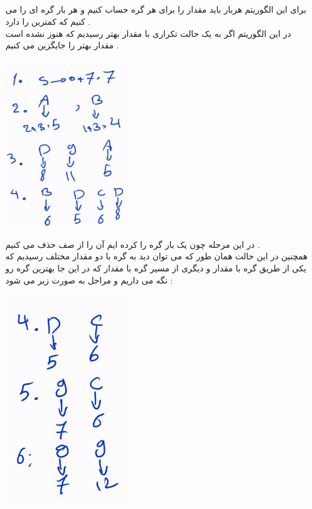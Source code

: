 \documentclass{article}
\begin{document}
\subsection*{\textcolor{red}{}}
برای این الگوریتم هربار باید مقدار 
را برای هر گره حساب کنیم و هر بار گره ای را 
می کنیم که کمترین 
را دارد  . 
\\
در این الگوریتم اگر به یک حالت تکراری با مقدار 
بهتر رسیدیم که هنوز 
نشده است مقدار بهتر را جایگزین می کنیم  . 
	\begin{center}
	\includegraphics[width=0.4\textwidth]{q2p2}
\end{center}
در این مرحله چون یک بار گره 
را 
کرده ایم آن را از صف حذف می کنیم . \\
همچنین در این حالت همان طور که می توان دید به گره 
با دو مقدار مختلف رسیدیم که یکی از طریق گره 
با مقدار 
و دیگری از مسیر گره 
با مقدار 
که در این جا بهترین گره رو نگه می داریم و مراحل به صورت زیر می شود  : 
\begin{center}
	\includegraphics[width=0.4\textwidth]{q2p3}
\end{center}
\end{document}
